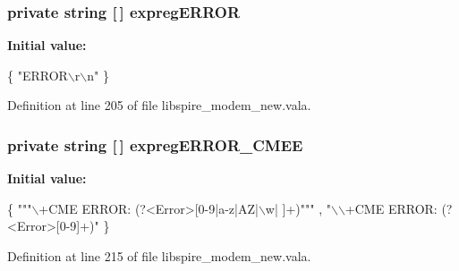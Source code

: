 \hypertarget{classedwinspire_1_1_ports_1_1_modem_abd723bb7da1c01fccb783ca6e5e7e80c}{
\subsubsection[{expreg\-E\-R\-R\-O\-R}]{\setlength{\rightskip}{0pt plus 5cm}private string \mbox{[}$\,$\mbox{]} expreg\-E\-R\-R\-O\-R\hspace{0.3cm}{\ttfamily [private]}}}\label{classedwinspire_1_1_ports_1_1_modem_abd723bb7da1c01fccb783ca6e5e7e80c}
{\bfseries Initial value\-:}
\begin{DoxyCode}
 \{
                                \textcolor{stringliteral}{"ERROR\(\backslash\)r\(\backslash\)n"}
                        \}
\end{DoxyCode}


Definition at line 205 of file libspire\-\_\-modem\-\_\-new.\-vala.

\hypertarget{classedwinspire_1_1_ports_1_1_modem_a50c1dc500ce1fa9e13bd301dd8accef4}{
\subsubsection[{expreg\-E\-R\-R\-O\-R\-\_\-\-C\-M\-E\-E}]{\setlength{\rightskip}{0pt plus 5cm}private string \mbox{[}$\,$\mbox{]} expreg\-E\-R\-R\-O\-R\-\_\-\-C\-M\-E\-E\hspace{0.3cm}{\ttfamily [private]}}}\label{classedwinspire_1_1_ports_1_1_modem_a50c1dc500ce1fa9e13bd301dd8accef4}
{\bfseries Initial value\-:}
\begin{DoxyCode}
 \{
                                \textcolor{stringliteral}{""}\textcolor{stringliteral}{"\(\backslash\)+CME ERROR: (?<Error>[0-9|a-z|AZ|\(\backslash\)w| ]+)"}\textcolor{stringliteral}{""}
      ,
                                \textcolor{stringliteral}{"\(\backslash\)\(\backslash\)+CME ERROR: (?<Error>[0-9]+)"}
                        \}
\end{DoxyCode}


Definition at line 215 of file libspire\-\_\-modem\-\_\-new.\-vala.

